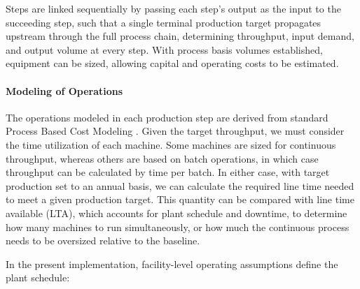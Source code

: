 \documentclass{article}
\renewcommand\_{\textunderscore\allowbreak}
\begin{document}
Steps are linked sequentially by passing each step's output as the input to the succeeding step, such that a single terminal production target propagates upstream through the full process chain, determining throughput, input demand, and output volume at every step. With process basis volumes established, equipment can be sized, allowing capital and operating costs to be estimated.

\paragraph{Modeling of Operations}\leavevmode\par

The operations modeled in each production step are derived from standard Process Based Cost Modeling \citep{kirchainCostModelingMaterials2001, fuchsStrategicMaterialsSelection2008}. Given the target throughput, we must consider the time utilization of each machine. Some machines are sized for continuous throughput, whereas others are based on batch operations, in which case throughput can be calculated by time per batch. In either case, with target production set to an annual basis, we can calculate the required line time needed to meet a given production target. This quantity can be compared with line time available (LTA), which accounts for plant schedule and downtime, to determine how many machines to run simultaneously, or how much the continuous process needs to be oversized relative to the baseline.

In the present implementation, facility-level operating assumptions define the plant schedule:
\end{document}
